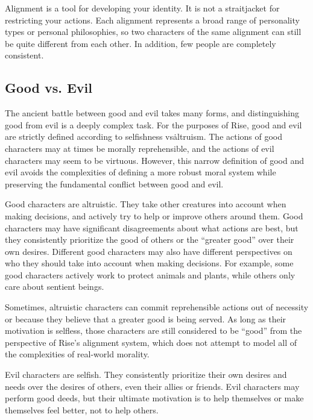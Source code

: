     Alignment is a tool for developing your identity.
    It is not a straitjacket for restricting your actions.
    Each alignment represents a broad range of personality types or personal philosophies, so two characters of the same alignment can still be quite different from each other.
    In addition, few people are completely consistent.

    \subsection{Good vs. Evil}
        The ancient battle between good and evil takes many forms, and distinguishing good from evil is a deeply complex task.
        For the purposes of Rise, good and evil are strictly defined according to selfishness vs\. altruism.
        The actions of good characters may at times be morally reprehensible, and the actions of evil characters may seem to be virtuous.
        However, this narrow definition of good and evil avoids the complexities of defining a more robust moral system while preserving the fundamental conflict between good and evil.

         Good characters are altruistic.
        They take other creatures into account when making decisions, and actively try to help or improve others around them.
        Good characters may have significant disagreements about what actions are best, but they consistently prioritize the good of others or the ``greater good'' over their own desires.
        Different good characters may also have different perspectives on who they should take into account when making decisions.
        For example, some good characters actively work to protect animals and plants, while others only care about sentient beings.

        Sometimes, altruistic characters can commit reprehensible actions out of necessity or because they believe that a greater good is being served.
        As long as their motivation is selfless, those characters are still considered to be ``good'' from the perspective of Rise's alignment system, which does not attempt to model all of the complexities of real-world morality.

         Evil characters are selfish.
        They consistently prioritize their own desires and needs over the desires of others, even their allies or friends.
        Evil characters may perform good deeds, but their ultimate motivation is to help themselves or make themselves feel better, not to help others.

